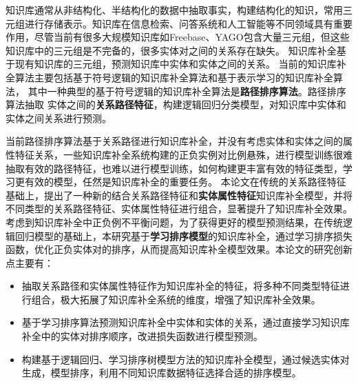 


\makeatother


\makeatother



\begin{cabstract}
  知识库通常从非结构化、半结构化的数据中抽取事实，构建结构化的知识，常用三元组进行存储表示。知识库在信息检索、问答系统和人工智能等不同领域具有重要作用，尽管当前有很多大规模知识库如Freebase、YAGO包含大量三元组，但这些知识库中的三元组是不完备的，很多实体对之间的关系存在缺失。 
  知识库补全基于现有知识库的三元组，预测知识库中实体和实体之间的关系。
  当前的知识库补全算法主要包括基于符号逻辑的知识库补全算法和基于表示学习的知识库补全算法，
  其中一种典型的基于符号逻辑的知识库补全算法是\textbf{路径排序算法}。路径排序算法抽取
  实体之间的\textbf{关系路径特征}，构建逻辑回归分类模型，对知识库中实体和实体之间关系进行预测。

  当前路径排序算法基于关系路径进行知识库补全，并没有考虑实体和实体之间的属性特征关系，一些知识库补全系统构建的正负实例对比例悬殊，进行模型训练很难抽取有效的路径特征，也难以进行模型训练，如何构建更丰富有效的特征类型，学习更有效的模型，任然是知识库补全的重要任务。
  本论文在传统的关系路径特征基础上，提出了一种新的结合关系路径特征和\textbf{实体属性特征}知识库补全模型，并将不同类型的关系路径特征、实体属性特征进行组合，显著提升了知识库补全效果。
  考虑到知识库补全中正负例不平衡问题，为了获得更好的模型预测结果，在传统逻辑回归模型的基础上，本研究基于\textbf{学习排序模型}的知识库补全，通过学习排序损失函数，优化正负实体对的排序，从而提高知识库补全模型效果。本论文的研究创新点主要有：
  \begin{itemize}[$\bullet$]
    \item 抽取关系路径和实体属性特征作为知识库补全的特征，将多种不同类型特征进行组合，极大拓展了知识库补全系统的维度，增强了知识库补全效果。
    \item 基于学习排序算法预测知识库补全中实体和实体的关系，通过直接学习知识库补全中的实体对排序顺序，改进损失函数进行模型预测。
    \item 构建基于逻辑回归、学习排序树模型方法的知识库补全模型，通过候选实体对生成，模型排序，利用不同知识库数据特征选择合适的排序模型。
  \end{itemize}
\end{cabstract}

